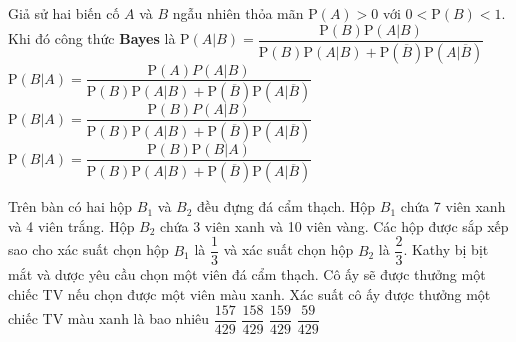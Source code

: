 \begin{ex}%
Giả sử hai biến cố $A$ và $B$ ngẫu nhiên thỏa mãn $\mathrm{P}(A)>0$ với $0<\mathrm{P}(B)<1$. Khi đó công thức {\bf Bayes} là
	\choice
	{$\mathrm{P}(A|B)=\dfrac{\mathrm{P}(B)\mathrm{P}(A|B)}{\mathrm{P}(B)\mathrm{P}(A|B)+\mathrm{P}(\overline{B})\mathrm{P}(A|\overline{B})}$}
	{$\mathrm{P}(B|A)=\dfrac{\mathrm{P}(A)P(A|B)}{\mathrm{P}(B)\mathrm{P}(A|B)+\mathrm{P}(\overline{B})\mathrm{P}(A|\overline{B})}$}
	{\True $\mathrm{P}(B|A)=\dfrac{\mathrm{P}(B)P(A|B)}{\mathrm{P}(B)\mathrm{P}(A|B)+\mathrm{P}(\overline{B})\mathrm{P}(A|\overline{B})}$}
	{$\mathrm{P}(B|A)=\dfrac{\mathrm{P}(B)\mathrm{P}(B|A)}{\mathrm{P}(B)\mathrm{P}(A|B)+\mathrm{P}(\overline{B})\mathrm{P}(A|\overline{B})}$}
\end{ex}
\begin{ex}%
	Trên bàn có hai hộp $B_1$ và $B_2$ đều đựng đá cẩm thạch. Hộp $B_1$ chứa 7 viên xanh và 4 viên trắng. Hộp $B_2$ chứa 3 viên xanh và 10 viên vàng. Các hộp được sắp xếp sao cho xác suất chọn hộp $B_1$ là $\dfrac{1}{3}$ và xác suất chọn hộp $B_2$ là $\dfrac{2}{3}$. Kathy bị bịt mắt và dược yêu cầu chọn một viên đá cẩm thạch. Cô ấy sẽ được thưởng một chiếc TV nếu chọn được một viên màu xanh. Xác suất cô ấy được thưởng một chiếc TV màu xanh là bao nhiêu
	\choice
	{\True $\dfrac{157}{429}$}
	{$\dfrac{158}{429}$}
	{$\dfrac{159}{429}$}
	{$\dfrac{59}{429}$}
	
\end{ex}
